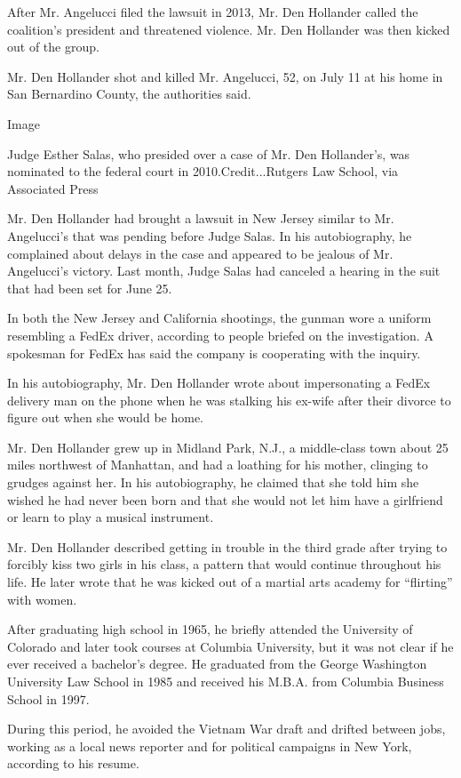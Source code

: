 After Mr. Angelucci filed the lawsuit in 2013, Mr. Den Hollander called
the coalition's president and threatened violence. Mr. Den Hollander was
then kicked out of the group.

Mr. Den Hollander shot and killed Mr. Angelucci, 52, on July 11 at his
home in San Bernardino County, the authorities said.

Image

Judge Esther Salas, who presided over a case of Mr. Den Hollander's, was
nominated to the federal court in 2010.Credit...Rutgers Law School, via
Associated Press

Mr. Den Hollander had brought a lawsuit in New Jersey similar to Mr.
Angelucci's that was pending before Judge Salas. In his autobiography,
he complained about delays in the case and appeared to be jealous of Mr.
Angelucci's victory. Last month, Judge Salas had canceled a hearing in
the suit that had been set for June 25.

In both the New Jersey and California shootings, the gunman wore a
uniform resembling a FedEx driver, according to people briefed on the
investigation. A spokesman for FedEx has said the company is cooperating
with the inquiry.

In his autobiography, Mr. Den Hollander wrote about impersonating a
FedEx delivery man on the phone when he was stalking his ex-wife after
their divorce to figure out when she would be home.

Mr. Den Hollander grew up in Midland Park, N.J., a middle-class town
about 25 miles northwest of Manhattan, and had a loathing for his
mother, clinging to grudges against her. In his autobiography, he
claimed that she told him she wished he had never been born and that she
would not let him have a girlfriend or learn to play a musical
instrument.

Mr. Den Hollander described getting in trouble in the third grade after
trying to forcibly kiss two girls in his class, a pattern that would
continue throughout his life. He later wrote that he was kicked out of a
martial arts academy for ``flirting'' with women.

After graduating high school in 1965, he briefly attended the University
of Colorado and later took courses at Columbia University, but it was
not clear if he ever received a bachelor's degree. He graduated from the
George Washington University Law School in 1985 and received his M.B.A.
from Columbia Business School in 1997.

During this period, he avoided the Vietnam War draft and drifted between
jobs, working as a local news reporter and for political campaigns in
New York, according to his resume.

